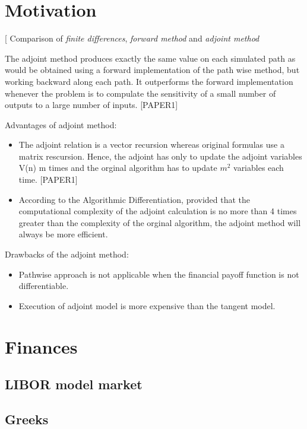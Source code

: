 \section{Motivation}

[ Comparison of \textit{finite differences}, \textit{forward method} and \textit{adjoint method}

The adjoint method produces exactly the same value on each simulated path as would be obtained using a forward implementation of the path wise method, but working backward along each path. It outperforms the forward implementation whenever the problem is to compulate the sensitivity of a small number of outputs to a large number of inputs. [PAPER1]

Advantages of adjoint method:
\begin{itemize}
\item The adjoint relation is a vector recursion whereas original formulas use a matrix rescursion. Hence, the adjoint has only to update the adjoint variables V(n) m times and the orginal algorithm has to update $m^2$ variables each time. [PAPER1]
\item According to the Algorithmic Differentiation, provided that the computational complexity of the adjoint calculation is no more than 4 times greater than the complexity of the orginal algorithm, the adjoint method will always be more efficient.
\end{itemize}

Drawbacks of the adjoint method:
\begin{itemize}
\item Pathwise approach is not applicable when the financial payoff function is not differentiable.
\item Execution of adjoint model is more expensive than the tangent model.
\end{itemize}


\section{Finances}
\subsection{LIBOR model market}
\subsection{Greeks}

